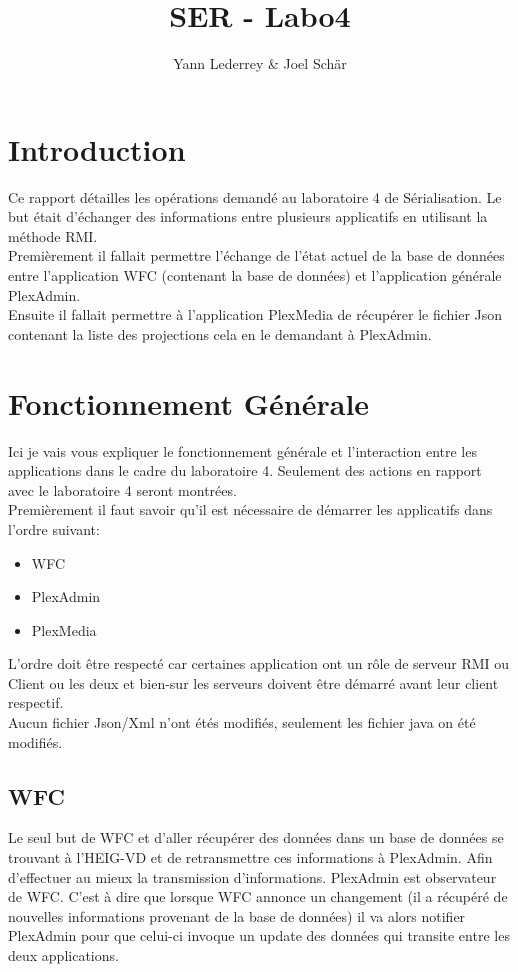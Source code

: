 \documentclass[a4paper]{article}
\title{SER - Labo4 \\}
\author{Yann Lederrey \& Joel Schär}
\begin{document}
\maketitle
\pagebreak

\tableofcontents
\pagebreak

\section{Introduction}
Ce rapport détailles les opérations demandé au laboratoire 4 de Sérialisation. Le but était d'échanger des informations entre plusieurs applicatifs en utilisant la méthode RMI.\\
Premièrement il fallait permettre l'échange de l'état actuel de la base de données entre l'application WFC (contenant la base de données) et l'application générale PlexAdmin.\\
Ensuite il fallait permettre à l'application PlexMedia de récupérer le fichier Json contenant la liste des projections cela en le demandant à PlexAdmin.


\section{Fonctionnement Générale}
Ici je vais vous expliquer le fonctionnement générale et l'interaction entre les applications dans le cadre du laboratoire 4. Seulement des actions en rapport avec le laboratoire 4 seront montrées.\\
Premièrement il faut savoir qu'il est nécessaire de démarrer les applicatifs dans l'ordre suivant:\\
\begin{itemize}
 \item WFC
 \item PlexAdmin
 \item PlexMedia
\end{itemize}
L'ordre doit être respecté car certaines application ont un rôle de serveur RMI ou Client ou les deux et bien-sur les serveurs doivent être démarré avant leur client respectif.\\

Aucun fichier Json/Xml n'ont étés modifiés, seulement les fichier java on été modifiés.

\subsection{WFC}
Le seul but de WFC et d'aller récupérer des données dans un base de données se trouvant à l'HEIG-VD et de retransmettre ces informations à PlexAdmin. Afin d'effectuer au mieux la transmission d'informations. PlexAdmin est observateur de WFC. C'est à dire que lorsque 
WFC annonce un changement (il a récupéré de nouvelles informations provenant de la base de données) il va alors notifier PlexAdmin pour que celui-ci invoque un update des données qui transite entre les deux applications.\\
\end{document}
